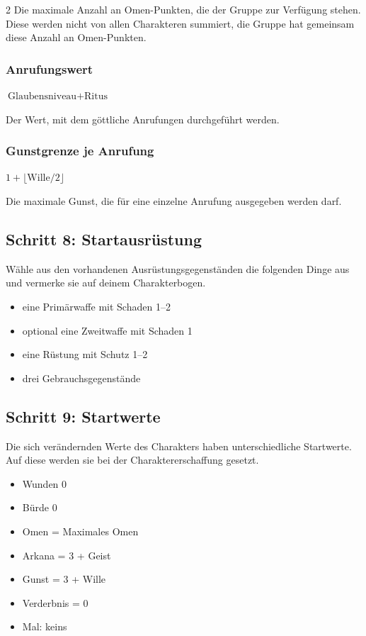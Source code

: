 \begin{multicols*}{2}
Die maximale Anzahl an Omen-Punkten, die der Gruppe zur Verfügung stehen.
Diese werden nicht von allen Charakteren summiert, die Gruppe hat gemeinsam diese Anzahl an Omen-Punkten.

\subsubsection{Anrufungswert}
$\text{Glaubensniveau} + \text{Ritus}$

Der Wert, mit dem göttliche Anrufungen durchgeführt werden.

\subsubsection{Gunstgrenze je Anrufung}
$1 + \lfloor \text{Wille} / 2 \rfloor$

Die maximale Gunst, die für eine einzelne Anrufung ausgegeben werden darf.

\subsection{Schritt 8: Startausrüstung}\label{subsec:schritt-8:-startausrustung}

Wähle aus den vorhandenen Ausrüstungsgegenständen die folgenden Dinge aus und vermerke sie auf deinem Charakterbogen.

\begin{itemize}[leftmargin=*]
\item eine Primärwaffe mit Schaden 1--2
\item optional eine Zweitwaffe mit Schaden 1
\item eine Rüstung mit Schutz 1--2
\item drei Gebrauchsgegenstände
\end{itemize}

\subsection{Schritt 9: Startwerte}\label{subsec:schritt-9:-startwerte}

Die sich verändernden Werte des Charakters haben unterschiedliche Startwerte.
Auf diese werden sie bei der Charaktererschaffung gesetzt.

\begin{itemize}[leftmargin=*]
\item Wunden 0
\item Bürde 0
\item Omen = Maximales Omen
\item Arkana = 3 + Geist
\item Gunst = 3 + Wille
\item Verderbnis = 0
\item Mal: keins
\end{itemize}


\end{multicols*}
